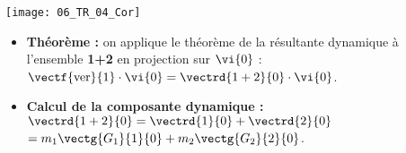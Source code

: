 \begin{marginfigure}
\texttt{[image: 06\_TR\_04\_Cor]}
\end{marginfigure}

\begin{itemize}
\item \textbf{Théorème :} on applique le théorème de la résultante dynamique à l'ensemble \textbf{1+2} en projection sur 
$\vi{0}$ : 
$\vectf{\text{ver}}{1}\cdot \vi{0}  = \vectrd{1+2}{0}\cdot \vi{0}$.
\item \textbf{Calcul de la composante dynamique :} 
$\vectrd{1+2}{0} = \vectrd{1}{0} +\vectrd{2}{0}$  $= m_1\vectg{G_1}{1}{0} +m_2 \vectg{G_2}{2}{0}$.
\end{itemize}
\else
\fi



\ifcolle
{}
\ifprof
\else
\fi
\else
\fi


\ifprof
\else
{}
\fi